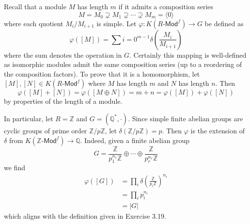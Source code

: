 \documentclass[../../master.tex]{subfiles}
\begin{document}
\begin{solution}
    Recall that a module $M$ has length $m$ if it admits a composition series
    \[
        M = M_0 \supsetneq M_1 \supsetneq \cdots \supsetneq M_m = \langle 0 \rangle
    \]
    where each quotient $M_i / M_{i+1}$ is simple.
    Let $\varphi : K(R\text{-}\mathsf{Mod}^{f}) \to G$ be defined as
    \[
        \varphi([M]) = \sum{i=0}^{m-1} \delta \left( \frac{M_i}{M_{i+1}} \right)
    \]
    where the sum denotes the operation in $G$.
    Certainly this mapping is well-defined as isomorphic modules admit the same composition series (up to a reordering of the composition factors).
    To prove that it is a homomorphism, let $[M], [N] \in K(R\text{-}\mathsf{Mod}^{f})$ where $M$ has length $m$ and $N$ has length $n$.
    Then
    \[
        \varphi([M] + [N]) = \varphi([M \oplus N]) = m + n = \varphi([M]) + \varphi([N])
    \]
    by properties of the length of a module.

    In particular, let $R = \mathbb{Z}$ and $G = (\mathbb{Q}^{*}, \cdot)$.
    Since simple finite abelian groups are cyclic groups of prime order $\mathbb{Z} / p\mathbb{Z}$, let $\delta (\mathbb{Z} / p\mathbb{Z}) = p$.
    Then $\varphi$ is the extension of $\delta$ from $K(\mathbb{Z}\text{-}\mathsf{Mod}^{f}) \to \mathbb{Q}$.
    Indeed, given a finite abelian group
    \[
    G = \frac{\mathbb{Z}}{p_1^{n_1}\mathbb{Z}} \oplus \cdots \oplus \frac{\mathbb{Z}}{p_r^{n_r}\mathbb{Z}}
    \]
    we find
    \begin{align*}
        \varphi([G]) &= \prod_{i} \delta \left( \frac{\mathbb{Z}}{p_i \mathbb{Z}} \right)^{n_i} \\
                     &= \prod_i p_i^{n_i} \\
                     &= |G|
    \end{align*}
    which aligns with the definition given in Exercise 3.19.
\end{solution}
\end{document}
